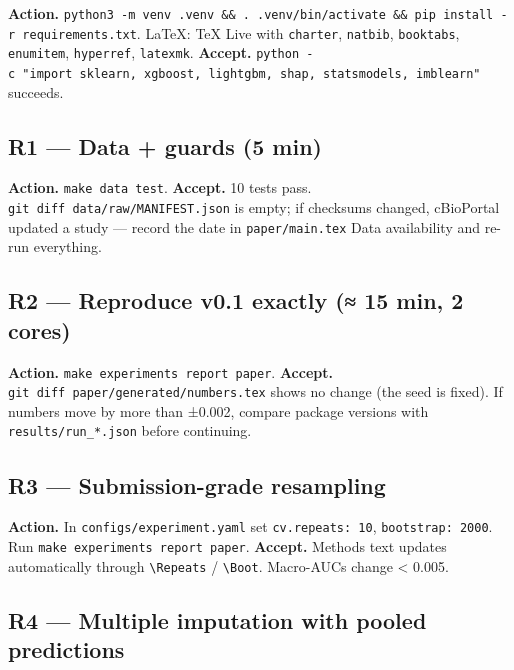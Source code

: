 \documentclass[
  10pt,
]{article}
\begin{document}
\textbf{Action.}
\texttt{python3\ -m\ venv\ .venv\ \&\&\ .\ .venv/bin/activate\ \&\&\ pip\ install\ -r\ requirements.txt}.
LaTeX: TeX Live with \texttt{charter}, \texttt{natbib},
\texttt{booktabs}, \texttt{enumitem}, \texttt{hyperref},
\texttt{latexmk}. \textbf{Accept.}
\texttt{python\ -c\ "import\ sklearn,\ xgboost,\ lightgbm,\ shap,\ statsmodels,\ imblearn"}
succeeds.

\hypertarget{r1-data-guards-5-min}{%
\subsection{R1 --- Data + guards (5 min)}\label{r1-data-guards-5-min}}

\textbf{Action.} \texttt{make\ data\ test}. \textbf{Accept.} 10 tests
pass. \texttt{git\ diff\ data/raw/MANIFEST.json} is empty; if checksums
changed, cBioPortal updated a study --- record the date in
\texttt{paper/main.tex} Data availability and re-run everything.

\hypertarget{r2-reproduce-v0.1-exactly-15-min-2-cores}{%
\subsection{R2 --- Reproduce v0.1 exactly (≈ 15 min, 2
cores)}\label{r2-reproduce-v0.1-exactly-15-min-2-cores}}

\textbf{Action.} \texttt{make\ experiments\ report\ paper}.
\textbf{Accept.} \texttt{git\ diff\ paper/generated/numbers.tex} shows
no change (the seed is fixed). If numbers move by more than ±0.002,
compare package versions with \texttt{results/run\_*.json} before
continuing.

\hypertarget{r3-submission-grade-resampling}{%
\subsection{R3 --- Submission-grade
resampling}\label{r3-submission-grade-resampling}}

\textbf{Action.} In \texttt{configs/experiment.yaml} set
\texttt{cv.repeats:\ 10}, \texttt{bootstrap:\ 2000}. Run
\texttt{make\ experiments\ report\ paper}. \textbf{Accept.} Methods text
updates automatically through \texttt{\textbackslash{}Repeats} /
\texttt{\textbackslash{}Boot}. Macro-AUCs change \textless{} 0.005.

\hypertarget{r4-multiple-imputation-with-pooled-predictions}{%
\subsection{R4 --- Multiple imputation with pooled
predictions}\label{r4-multiple-imputation-with-pooled-predictions}}
\end{document}
